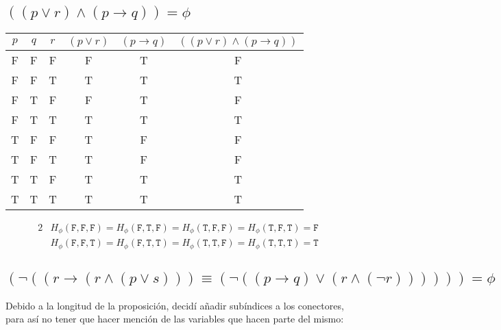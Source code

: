 \documentclass{article}
\begin{document}
\subsection{$((p \vee r) \wedge (p \to q)) = \phi$}
\begin{center}
    \begin{NiceTabular}{|c|c|c|c|c|c|}
        \hline
        $p$ & $q$ & $r$ & $(p \vee r)$ & $(p \to q)$ & $((p \vee r) \wedge (p \to q))$\\
        \hline
        \ttfamily F & \ttfamily F & \ttfamily F & \ttfamily F & \ttfamily T & \ttfamily F\\
        \ttfamily F & \ttfamily F & \ttfamily T & \ttfamily T & \ttfamily T & \ttfamily T\\
        \ttfamily F & \ttfamily T & \ttfamily F & \ttfamily F & \ttfamily T & \ttfamily F\\
        \ttfamily F & \ttfamily T & \ttfamily T & \ttfamily T & \ttfamily T & \ttfamily T\\
        \ttfamily T & \ttfamily F & \ttfamily F & \ttfamily T & \ttfamily F & \ttfamily F\\
        \ttfamily T & \ttfamily F & \ttfamily T & \ttfamily T & \ttfamily F & \ttfamily F\\
        \ttfamily T & \ttfamily T & \ttfamily F & \ttfamily T & \ttfamily T & \ttfamily T\\
        \ttfamily T & \ttfamily T & \ttfamily T & \ttfamily T & \ttfamily T & \ttfamily T\\
        \hline
    \end{NiceTabular}
\end{center}
\begin{alignat*}{2}
    &H_{\phi}(\mathtt{F}, \mathtt{F}, \mathtt{F}) = H_{\phi}(\mathtt{F}, \mathtt{T}, \mathtt{F}) = H_{\phi}(\mathtt{T}, \mathtt{F}, \mathtt{F}) = H_{\phi}(\mathtt{T}, \mathtt{F}, \mathtt{T}) = \mathtt{F}\\
    &H_{\phi}(\mathtt{F}, \mathtt{F}, \mathtt{T}) = H_{\phi}(\mathtt{F}, \mathtt{T}, \mathtt{T}) = H_{\phi}(\mathtt{T}, \mathtt{T}, \mathtt{F}) = H_{\phi}(\mathtt{T}, \mathtt{T}, \mathtt{T}) = \mathtt{T}
\end{alignat*}
\subsection{$(\lnot((r \to (r \wedge (p \vee s))) \equiv (\lnot((p \to q) \vee (r \wedge (\lnot r)))))) = \phi$}

Debido a la longitud de la proposición, decidí añadir subíndices a los conectores, para así no tener que hacer mención de las variables que hacen parte del mismo:
\end{document}
